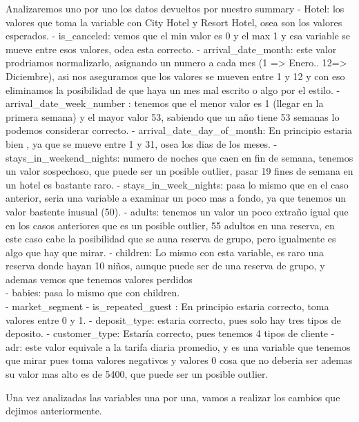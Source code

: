 \documentclass[]{article}
\begin{document}
Analizaremos uno por uno los datos devueltos por nuestro summary -
Hotel: los valores que toma la variable con City Hotel y Resort Hotel,
osea son los valores esperados. - is\_canceled: vemos que el min valor
es 0 y el max 1 y esa variable se mueve entre esos valores, odea esta
correcto. - arrival\_date\_month: este valor prodriamos normalizarlo,
asignando un numero a cada mes (1 =\textgreater{} Enero..
12=\textgreater{} Diciembre), asi nos aseguramos que los valores se
mueven entre 1 y 12 y con eso eliminamos la posibilidad de que haya un
mes mal escrito o algo por el estilo. - arrival\_date\_week\_number :
tenemos que el menor valor es 1 (llegar en la primera semana) y el mayor
valor 53, sabiendo que un año tiene 53 semanas lo podemos considerar
correcto. - arrival\_date\_day\_of\_month: En principio estaria bien ,
ya que se mueve entre 1 y 31, osea los dias de los meses. -
stays\_in\_weekend\_nights: numero de noches que caen en fin de semana,
tenemos un valor sospechoso, que puede ser un posible outlier, pasar 19
fines de semana en un hotel es bastante raro. - stays\_in\_week\_nights:
pasa lo mismo que en el caso anterior, seria una variable a examinar un
poco mas a fondo, ya que tenemos un valor bastente inusual (50). -
adults: tenemos un valor un poco extraño igual que en los casos
anteriores que es un posible outlier, 55 adultos en una reserva, en este
caso cabe la posibilidad que se auna reserva de grupo, pero igualmente
es algo que hay que mirar. - children: Lo mismo con esta variable, es
raro una reserva donde hayan 10 niños, aunque puede ser de una reserva
de grupo, y ademas vemos que tenemos valores perdidos\\
- babies: pasa lo mismo que con children.\\
- market\_segment - is\_repeated\_guest : En principio estaria correcto,
toma valores entre 0 y 1. - deposit\_type: estaria correcto, pues solo
hay tres tipos de deposito. - customer\_type: Estaría correcto, pues
tenemos 4 tipos de cliente - adr: este valor equivale a la tarifa diaria
promedio, y es una variable que tenemos que mirar pues toma valores
negativos y valores 0 cosa que no deberia ser ademas su valor mas alto
es de 5400, que puede ser un posible outlier.

Una vez analizadas las variables una por una, vamos a realizar los
cambios que dejimos anteriormente.
\end{document}
